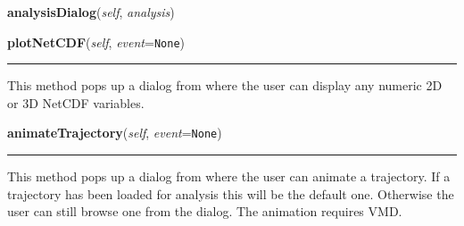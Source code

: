     \vspace{0.5ex}

\hspace{.8\funcindent}\begin{boxedminipage}{\funcwidth}

    \raggedright \textbf{analysisDialog}(\textit{self}, \textit{analysis})

\setlength{\parskip}{2ex}
\setlength{\parskip}{1ex}
    \end{boxedminipage}

    \label{nMOLDYN:GUI:MainDialog:MainDialog:plotNetCDF}

    \vspace{0.5ex}

\hspace{.8\funcindent}\begin{boxedminipage}{\funcwidth}

    \raggedright \textbf{plotNetCDF}(\textit{self}, \textit{event}={\tt None})

    \vspace{-1.5ex}

    \rule{\textwidth}{0.5\fboxrule}
\setlength{\parskip}{2ex}
    This method pops up a dialog from where the user can display any 
    numeric 2D or 3D NetCDF variables.

\setlength{\parskip}{1ex}
    \end{boxedminipage}

    \label{nMOLDYN:GUI:MainDialog:MainDialog:animateTrajectory}

    \vspace{0.5ex}

\hspace{.8\funcindent}\begin{boxedminipage}{\funcwidth}

    \raggedright \textbf{animateTrajectory}(\textit{self}, \textit{event}={\tt None})

    \vspace{-1.5ex}

    \rule{\textwidth}{0.5\fboxrule}
\setlength{\parskip}{2ex}
    This method pops up a dialog from where the user can animate a 
    trajectory. If a trajectory has been loaded for analysis this will be 
    the default one. Otherwise the user can still browse one from the 
    dialog. The animation requires VMD.

\setlength{\parskip}{1ex}
    \end{boxedminipage}


